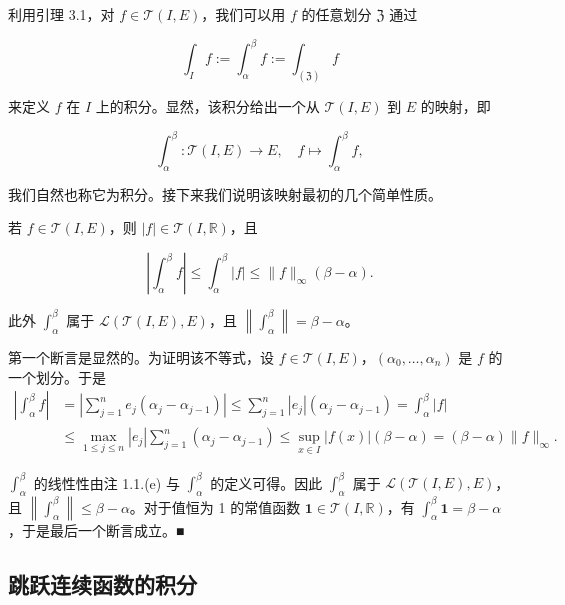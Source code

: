 利用引理 3.1，对 $ f \in \mathcal{T}(I, E) $，我们可以用 $ f $ 的任意划分 $ \mathfrak{Z} $ 通过

\[
\int_{I} f := \int_{\alpha}^{\beta} f := \int_{(\mathfrak{Z})} f
\]

来定义 $ f $ 在 $ I $ 上的积分。显然，该积分给出一个从 $ \mathcal{T}(I, E) $ 到 $ E $ 的映射，即

\[
\int_{\alpha}^{\beta} : \mathcal{T}(I, E) \to E, \quad f \mapsto \int_{\alpha}^{\beta} f ,
\]

我们自然也称它为积分。接下来我们说明该映射最初的几个简单性质。

\begin{lemma}

若 $ f \in \mathcal{T}(I, E) $，则 $ |f| \in \mathcal{T}(I, \mathbb{R}) $，且

\[
\left| \int_{\alpha}^{\beta} f \right| \le \int_{\alpha}^{\beta} |f| \le \|f\|_{\infty} (\beta - \alpha) .
\]

此外 $ \int_{\alpha}^{\beta} $ 属于 $ \mathcal{L}(\mathcal{T}(I, E), E) $，且 $ \left\| \int_{\alpha}^{\beta} \right\| = \beta - \alpha $。

\proofhead
第一个断言是显然的。为证明该不等式，设 $ f \in \mathcal{T}(I, E) $，$ (\alpha_0, \ldots, \alpha_n) $ 是 $ f $ 的一个划分。于是
\begin{equation*}
\begin{aligned}
\left| \int_{\alpha}^{\beta} f \right| &= \left| \sum_{j=1}^{n} e_j(\alpha_j - \alpha_{j-1}) \right| \le \sum_{j=1}^{n} |e_j| (\alpha_j - \alpha_{j-1}) = \int_{\alpha}^{\beta} |f| \\ &\le \max_{1 \le j \le n} |e_j| \sum_{j=1}^{n} (\alpha_j - \alpha_{j-1}) \le \sup_{x \in I} |f(x)| (\beta - \alpha) = (\beta - \alpha) \|f\|_{\infty} .
\end{aligned}
\end{equation*}

$ \int_{\alpha}^{\beta} $ 的线性性由注 1.1.(e) 与 $ \int_{\alpha}^{\beta} $ 的定义可得。因此 $ \int_{\alpha}^{\beta} $ 属于 $ \mathcal{L}(\mathcal{T}(I, E), E) $，且 $ \left\| \int_{\alpha}^{\beta} \right\| \le \beta - \alpha $。对于值恒为 1 的常值函数 $ \mathbf{1} \in \mathcal{T}(I, \mathbb{R}) $，有 $ \int_{\alpha}^{\beta} \mathbf{1} = \beta - \alpha $，于是最后一个断言成立。\nobreak\hspace{0.35em}■

\end{lemma}

\subsection*{跳跃连续函数的积分}

